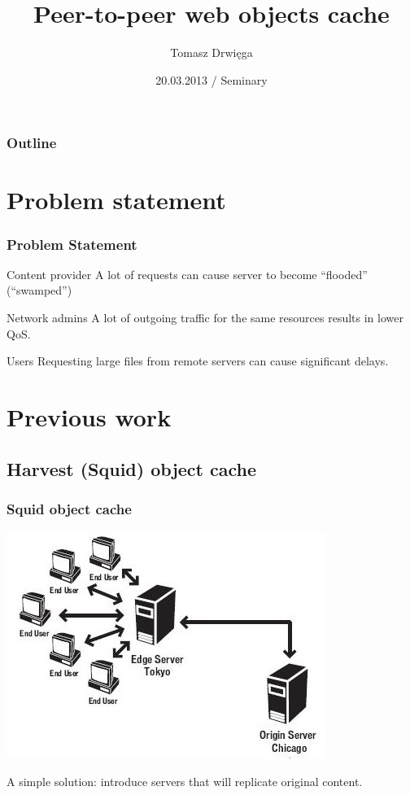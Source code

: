 \documentclass{beamer}
\title{Peer-to-peer web objects cache}
\author{Tomasz Drwięga}
\date{20.03.2013 / Seminary}
\begin{document}
\begin{frame}
\titlepage
\end{frame}

\begin{frame}
\frametitle{Outline}
\tableofcontents
\end{frame}


\section{Problem statement}

\begin{frame}
\frametitle{Problem Statement}

\begin{block}{Content provider}
A lot of requests can cause server to become ``flooded'' (``swamped'')
\end{block}
\pause
\begin{block}{Network admins}
A lot of outgoing traffic for the same resources results in lower QoS.
\end{block}
\pause
\begin{block}{Users}
Requesting large files from remote servers can cause significant delays.
\end{block}
\end{frame}


\section{Previous work}
\subsection{Harvest (Squid) object cache}

\begin{frame}
\frametitle{Squid object cache}

\includegraphics[width=0.8\linewidth]{media_server2_edge.jpg}

\begin{block}{}
A simple solution: introduce servers that will replicate original content.
\end{block}

\end{frame}
\end{document}
